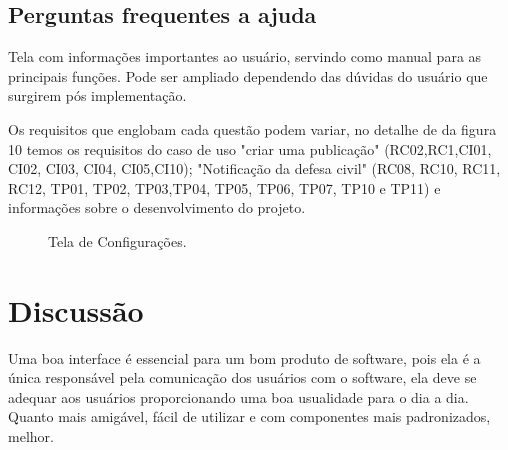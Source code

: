\documentclass[12pt]{article}
\begin{document}
\subsection{Perguntas frequentes a ajuda}\label{subsec:SecFaq}
Tela com informações importantes ao usuário, servindo como manual para as principais funções. Pode ser ampliado dependendo das dúvidas do usuário que surgirem pós implementação.

Os requisitos que englobam cada questão podem variar, no detalhe de da figura 10 temos os requisitos do caso de uso "criar uma publicação" (RC02,RC1,CI01, CI02, CI03, CI04, CI05,CI10); "Notificação da defesa civil" (RC08,  RC10,  RC11,  RC12, TP01, TP02, TP03,TP04, TP05, TP06, TP07, TP10 e TP11) e informações sobre o desenvolvimento do projeto. 

\begin{figure}[h!]
  \caption{Tela de Configurações.}
  \label{fig:Perguntas frequentes e ajuda}
\end{figure}
\vfill%
\pagebreak

\section{Discussão}

Uma boa interface é essencial para um bom produto de software, pois ela é a única responsável pela comunicação dos usuários com o software, ela deve se adequar aos usuários proporcionando uma boa usualidade para o dia a dia. Quanto mais amigável, fácil de utilizar e com componentes mais padronizados, melhor.
\end{document}
